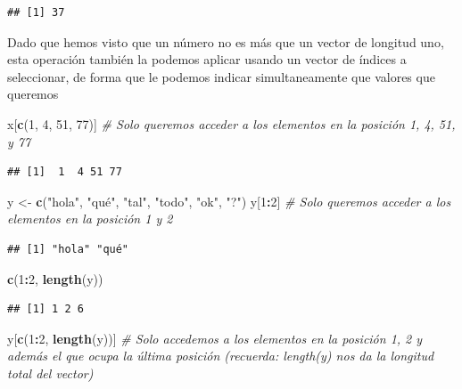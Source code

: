 \documentclass[11pt,]{book}
\newenvironment{Shaded}{\begin{snugshade}}{\end{snugshade}}
\newcommand{\CommentTok}[1]{\textcolor[rgb]{0.37,0.37,0.37}{\textit{#1}}}
\newcommand{\DecValTok}[1]{\textcolor[rgb]{0.06,0.06,0.06}{#1}}
\newcommand{\KeywordTok}[1]{\textcolor[rgb]{0.27,0.27,0.27}{\textbf{#1}}}
\newcommand{\NormalTok}[1]{#1}
\newcommand{\OperatorTok}[1]{\textcolor[rgb]{0.43,0.43,0.43}{\textbf{#1}}}
\newcommand{\StringTok}[1]{\textcolor[rgb]{0.5,0.5,0.5}{#1}}
\begin{document}
\begin{verbatim}
## [1] 37
\end{verbatim}

Dado que hemos visto que un número no es más que un vector de longitud uno, esta operación también la podemos aplicar usando un vector de índices a seleccionar, de forma que le podemos indicar simultaneamente que valores que queremos

\begin{Shaded}
\begin{Highlighting}[]
\NormalTok{x[}\KeywordTok{c}\NormalTok{(}\DecValTok{1}\NormalTok{, }\DecValTok{4}\NormalTok{, }\DecValTok{51}\NormalTok{, }\DecValTok{77}\NormalTok{)] }\CommentTok{# Solo queremos acceder a los elementos en la posición 1, 4, 51, y 77}
\end{Highlighting}
\end{Shaded}

\begin{verbatim}
## [1]  1  4 51 77
\end{verbatim}

\begin{Shaded}
\begin{Highlighting}[]
\NormalTok{y <-}\StringTok{ }\KeywordTok{c}\NormalTok{(}\StringTok{"hola"}\NormalTok{, }\StringTok{"qué"}\NormalTok{, }\StringTok{"tal"}\NormalTok{, }\StringTok{"todo"}\NormalTok{, }\StringTok{"ok"}\NormalTok{, }\StringTok{"?"}\NormalTok{)}
\NormalTok{y[}\DecValTok{1}\OperatorTok{:}\DecValTok{2}\NormalTok{] }\CommentTok{# Solo queremos acceder a los elementos en la posición 1 y 2}
\end{Highlighting}
\end{Shaded}

\begin{verbatim}
## [1] "hola" "qué"
\end{verbatim}

\begin{Shaded}
\begin{Highlighting}[]
\KeywordTok{c}\NormalTok{(}\DecValTok{1}\OperatorTok{:}\DecValTok{2}\NormalTok{, }\KeywordTok{length}\NormalTok{(y))}
\end{Highlighting}
\end{Shaded}

\begin{verbatim}
## [1] 1 2 6
\end{verbatim}

\begin{Shaded}
\begin{Highlighting}[]
\NormalTok{y[}\KeywordTok{c}\NormalTok{(}\DecValTok{1}\OperatorTok{:}\DecValTok{2}\NormalTok{, }\KeywordTok{length}\NormalTok{(y))] }\CommentTok{# Solo accedemos a los elementos en la posición 1, 2 y además el que ocupa la última posición (recuerda: length(y) nos da la longitud total del vector)}
\end{Highlighting}
\end{Shaded}
\end{document}
